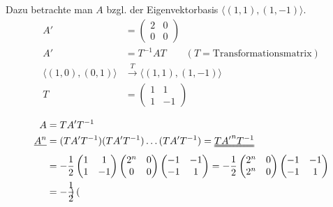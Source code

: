 \documentclass[%
a4paper,
11pt,		%
]
{scrartcl}
\theoremstyle{plain}
\theoremstyle{plain}
\theoremstyle{plain}
\theoremstyle{plain}
\theoremstyle{plain}
\begin{document}
\begin{enumerate}
        Dazu betrachte man $A$ bzgl. der Eigenvektorbasis $\langle (1,1),(1,-1) \rangle$.
        \begin{align*}
            A' & =
            \begin{pmatrix}
                2 & 0\\
                0 & 0
            \end{pmatrix}\\
            A' & = T^{-1} A T \qquad (T = \text{Transformationsmatrix})\\
            \langle (1,0),(0,1) \rangle & \overset{T}{\to} \langle (1,1),(1,-1) \rangle\\
            T & = 
            \begin{pmatrix}
                1 & 1\\
                1 & -1
            \end{pmatrix}\\
        \end{align*}
        \begin{align*}
            A & = T A' T^{-1}\\
            \uline{A^n} & = (T A' T^{-1})(T A' T^{-1}) \ldots (T A' T^{-1}) = \uuline{T {A'}^n T^{-1}}\\
            & = -\frac{1}{2}
            \begin{pmatrix}
                1 & 1\\
                1 & -1
            \end{pmatrix}
            \begin{pmatrix}
                2^n & 0\\
                0 & 0
            \end{pmatrix}
            \begin{pmatrix}
                -1 & -1\\
                -1 & 1
            \end{pmatrix}
            =
            -\frac{1}{2}
            \begin{pmatrix}
                2^n & 0\\
                2^n & 0
            \end{pmatrix}
            \begin{pmatrix}
                -1 & -1\\
                -1 & 1
            \end{pmatrix}\\
            & =
            -\frac{1}{2}
            \begin{pmatrix}

\end{pmatrix}
\end{align*}
\end{enumerate}
\end{document}
